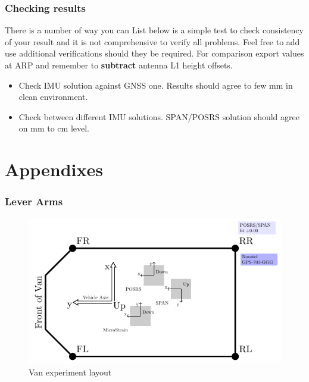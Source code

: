 \documentclass[11pt,fleqn]{book} %
\begin{document}
\section{Checking results}

There is a number of way you can  List below is a simple test to check consistency of your result and it is not comprehensive to verify all problems. Feel free to add use additional verifications should they be required. For comparison export values at ARP and remember to \textbf{subtract} antenna L1 height offsets.

\begin{itemize}
	\item Check IMU solution against GNSS one. Results should agree to few mm in clean environment.
	\item Check between different IMU solutions. SPAN/POSRS solution should agree on mm to cm level.
\end{itemize}


\renewcommand\thesection{\Alph{section}}
\renewcommand{\thepart}{\Alph{part}}
\setcounter{part}{0}
\setcounter{chapter}{1}
\setcounter{section}{0}
\part{Appendixes}



\section{Lever Arms}

\begin{figure}[!htb]
\centering\includegraphics[clip,width=16cm]{pic/VanLayout}%
\caption{Van experiment layout\label{fig:Van-experiment-layout}}
\end{figure}
\end{document}
